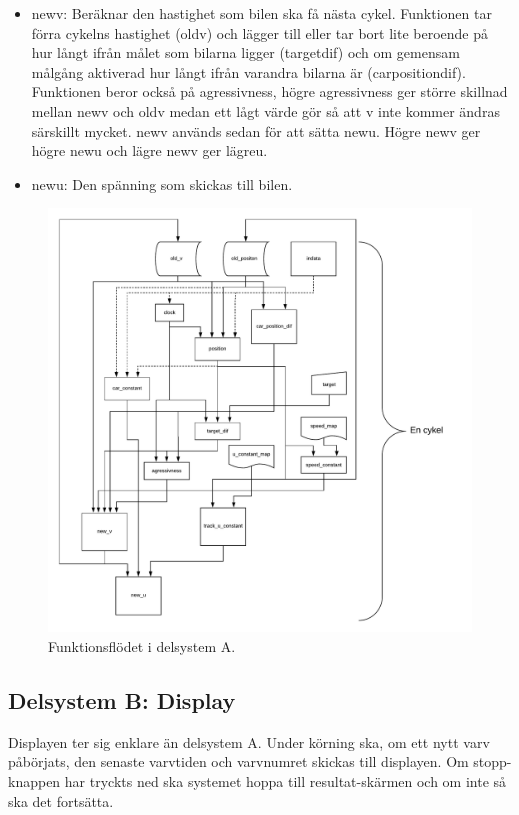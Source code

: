 \begin{itemize}
\item new\textunderscore v: Beräknar den hastighet som bilen ska få nästa cykel. Funktionen tar förra cykelns hastighet (old\textunderscore v) 
och lägger till eller tar bort lite beroende på hur långt ifrån målet som bilarna ligger (target\textunderscore dif) och om gemensam
målgång aktiverad hur långt ifrån varandra bilarna är (car\textunderscore position\textunderscore dif). Funktionen beror 
också på agressivness, högre agressivness ger större skillnad mellan new\textunderscore v och old\textunderscore v medan ett lågt värde gör så att v 
inte kommer ändras särskillt mycket.
new\textunderscore v används sedan för att sätta
new\textunderscore u. Högre new\textunderscore v ger högre new\textunderscore u och lägre new\textunderscore v ger lägre\textunderscore u. 
      \item new\textunderscore u: Den spänning som skickas till bilen.

    \end{itemize}

    \begin{figure}
      \centering
      \includegraphics[width=\linewidth]{figures/flow.pdf}
      \caption{Funktionsflödet i delsystem A.}%
      \label{fig:flow_diagram}
    \end{figure}

  \subsection{Delsystem B: Display}

  Displayen ter sig enklare än delsystem A. Under körning ska, om ett nytt varv
  påbörjats, den senaste varvtiden och varvnumret skickas till displayen. Om
  stopp-knappen har tryckts ned ska systemet hoppa till resultat-skärmen och om
  inte så ska det fortsätta.

